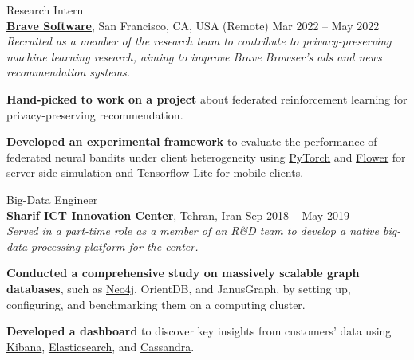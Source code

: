 \documentclass[11pt]{article}
\begin{document}
\begin{outerlist}

	\item {Research Intern}\\
	\textbf{\href{https://brave.com/}{Brave Software}}, San Francisco, CA, USA (Remote) \hfill {Mar 2022 -- May 2022}\\
  \textit{Recruited as a member of the research team to contribute to privacy-preserving machine learning research, aiming to improve Brave Browser's ads and news recommendation systems.}
	\begin{innerlist}
		\item \textbf{Hand-picked to work on a project} about federated reinforcement learning for privacy-preserving recommendation.
		\item \textbf{Developed an experimental framework} to evaluate the performance of federated neural bandits under client heterogeneity using \href{https://pytorch.org/}{PyTorch} and \href{https://flower.dev/}{Flower} for server-side simulation and \href{https://www.tensorflow.org/lite}{Tensorflow-Lite} for mobile clients.
	\end{innerlist}


	\item {Big-Data Engineer} \\
	\href{http://ictic.sharif.ir}{\textbf{Sharif ICT Innovation Center}}, Tehran, Iran \hfill {Sep 2018 -- May 2019}\\
  \textit{Served in a part-time role as a member of an R\&D team to develop a native big-data processing platform for the center.}
	\begin{innerlist}
		\item \textbf{Conducted a comprehensive study on massively scalable graph databases}, such as \href{https://neo4j.com/}{Neo4j}, OrientDB, and JanusGraph, by setting up, configuring, and benchmarking them on a computing cluster.
		\item \textbf{Developed a dashboard} to discover key insights from customers' data using \href{https://www.elastic.co/kibana}{Kibana}, \href{https://www.elastic.co/elasticsearch/}{Elasticsearch}, and \href{https://cassandra.apache.org/}{Cassandra}.
	\end{innerlist}



\end{outerlist}
\end{document}
